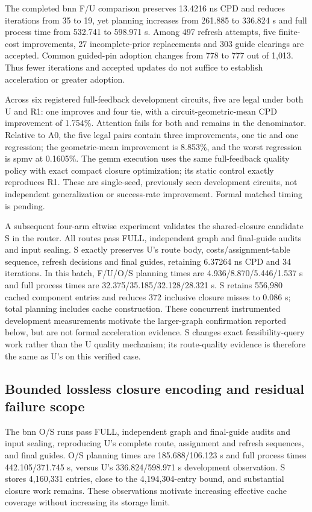 \documentclass[conference,10pt]{IEEEtran}
\begin{document}
The completed bnn F/U comparison preserves 13.4216 ns CPD and reduces iterations from 35 to 19, yet planning increases from 261.885 to 336.824 s and full process time from 532.741 to 598.971 s. Among 497 refresh attempts, five finite-cost improvements, 27 incomplete-prior replacements and 303 guide clearings are accepted. Common guided-pin adoption changes from 778 to 777 out of 1,013. Thus fewer iterations and accepted updates do not suffice to establish acceleration or greater adoption.

Across six registered full-feedback development circuits, five are legal under both U and R1: one improves and four tie, with a circuit-geometric-mean CPD improvement of 1.754\%. Attention fails for both and remains in the denominator. Relative to A0, the five legal pairs contain three improvements, one tie and one regression; the geometric-mean improvement is 8.853\%, and the worst regression is spmv at 0.1605\%. The gemm execution uses the same full-feedback quality policy with exact compact closure optimization; its static control exactly reproduces R1. These are single-seed, previously seen development circuits, not independent generalization or success-rate improvement. Formal matched timing is pending.

A subsequent four-arm eltwise experiment validates the shared-closure candidate S in the router. All routes pass FULL, independent graph and final-guide audits and input sealing. S exactly preserves U's route body, costs/assignment-table sequence, refresh decisions and final guides, retaining 6.37264 ns CPD and 34 iterations. In this batch, F/U/O/S planning times are 4.936/8.870/5.446/1.537 s and full process times are 32.375/35.185/32.128/28.321 s. S retains 556,980 cached component entries and reduces 372 inclusive closure misses to 0.086 s; total planning includes cache construction. These concurrent instrumented development measurements motivate the larger-graph confirmation reported below, but are not formal acceleration evidence. S changes exact feasibility-query work rather than the U quality mechanism; its route-quality evidence is therefore the same as U's on this verified case.


\subsection{Bounded lossless closure encoding and residual failure scope}
The bnn O/S runs pass FULL, independent graph and final-guide audits and input sealing, reproducing U's complete route, assignment and refresh sequences, and final guides. O/S planning times are 185.688/106.123 s and full process times 442.105/371.745 s, versus U's 336.824/598.971 s development observation. S stores 4,160,331 entries, close to the 4,194,304-entry bound, and substantial closure work remains. These observations motivate increasing effective cache coverage without increasing its storage limit.
\end{document}
